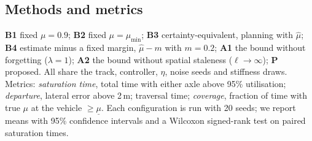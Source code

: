 \documentclass[letterpaper,journal,twoside]{IEEEtran}%
\newcommand{\mulb}{\underline{\mu}}
\begin{document}
\subsection{Methods and metrics}
\textbf{B1} fixed $\mu=0.9$; \textbf{B2} fixed $\mu=\mu_{\min}$; \textbf{B3} certainty-equivalent, planning with $\hat\mu$; \textbf{B4} estimate minus a fixed margin, $\hat\mu-m$ with $m=0.2$; \textbf{A1} the bound without forgetting ($\lambda=1$); \textbf{A2} the bound without spatial staleness ($\ell\to\infty$); \textbf{P} proposed. All share the track, controller, $\eta$, noise seeds and stiffness draws.
Metrics: \emph{saturation time}, total time with either axle above 95\% utilisation; \emph{departure}, lateral error above 2\,m; traversal time; \emph{coverage}, fraction of time with true $\mu$ at the vehicle $\ge\mulb$. Each configuration is run with 20 seeds; we report means with 95\% confidence intervals and a Wilcoxon signed-rank test on paired saturation times.

\end{document}
